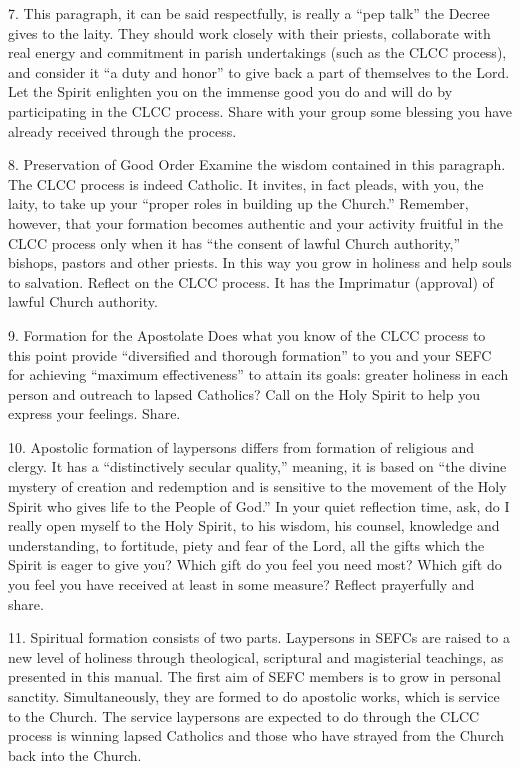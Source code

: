 \documentclass[oneside]{book}
\begin{document}
7. This paragraph, it can be said respectfully, is really a ``pep talk'' the
Decree gives to the laity. They should work closely with their priests,
collaborate with real energy and commitment in parish undertakings (such as the
CLCC process), and consider it ``a duty and honor'' to give back a part of
themselves to the Lord. Let the Spirit enlighten you on the immense good you do
and will do by participating in the CLCC process. Share with your group some
blessing you have already received through the process.

8. Preservation of Good Order
Examine the wisdom contained in this paragraph. The CLCC process is indeed
Catholic. It invites, in fact pleads, with you, the laity, to take up your
``proper roles in building up the Church.'' Remember, however, that your
formation becomes authentic and your activity fruitful in the CLCC process only
when it has ``the consent of lawful Church authority,'' bishops, pastors and
other priests. In this way you grow in holiness and help souls to
salvation. Reflect on the CLCC process. It has the Imprimatur (approval) of
lawful Church authority.

9. Formation for the Apostolate
Does what you know of the CLCC process to this point provide ``diversified and
thorough formation'' to you and your SEFC for achieving ``maximum
effectiveness'' to attain its goals: greater holiness in each person and
outreach to lapsed Catholics? Call on the Holy Spirit to help you express your
feelings. Share.

10. Apostolic formation of laypersons differs from formation of religious and
clergy. It has a ``distinctively secular quality,'' meaning, it is based on
``the divine mystery of creation and redemption and is sensitive to the movement
of the Holy Spirit who gives life to the People of God.'' In your quiet
reflection time, ask, do I really open myself to the Holy Spirit, to his wisdom,
his counsel, knowledge and understanding, to fortitude, piety and fear of the
Lord, all the gifts which the Spirit is eager to give you? Which gift do you
feel you need most? Which gift do you feel you have received at least in some
measure? Reflect prayerfully and share.

11. Spiritual formation consists of two parts. Laypersons in SEFCs are raised to
a new level of holiness through theological, scriptural and magisterial
teachings, as presented in this manual. The first aim of SEFC members is to grow
in personal sanctity. Simultaneously, they are formed to do apostolic works,
which is service to the Church. The service laypersons are expected to do
through the CLCC process is winning lapsed Catholics and those who have strayed
from the Church back into the Church.
\end{document}
